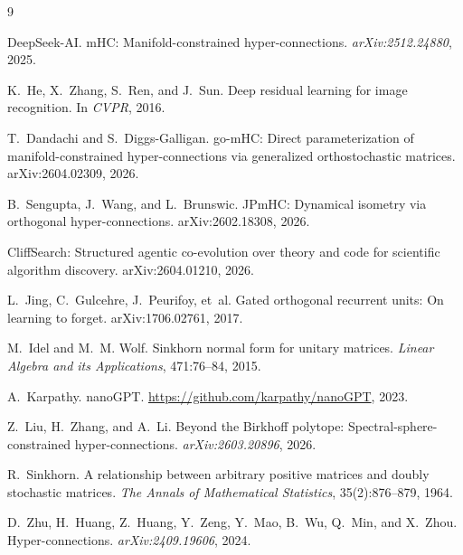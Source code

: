 \documentclass{article}
\begin{document}
\begin{thebibliography}{9}

DeepSeek-AI.
mHC: Manifold-constrained hyper-connections.
\emph{arXiv:2512.24880}, 2025.

K.~He, X.~Zhang, S.~Ren, and J.~Sun.
Deep residual learning for image recognition. In \emph{CVPR}, 2016.

T.~Dandachi and S.~Diggs-Galligan.
go-mHC: Direct parameterization of manifold-constrained hyper-connections via
generalized orthostochastic matrices. arXiv:2604.02309, 2026.

B.~Sengupta, J.~Wang, and L.~Brunswic.
JPmHC: Dynamical isometry via orthogonal hyper-connections. arXiv:2602.18308, 2026.

CliffSearch: Structured agentic co-evolution over theory and code for scientific
algorithm discovery. arXiv:2604.01210, 2026.

L.~Jing, C.~Gulcehre, J.~Peurifoy, et~al.
Gated orthogonal recurrent units: On learning to forget. arXiv:1706.02761, 2017.

M.~Idel and M.~M. Wolf.
Sinkhorn normal form for unitary matrices.
\emph{Linear Algebra and its Applications}, 471:76--84, 2015.

A.~Karpathy. nanoGPT. \url{https://github.com/karpathy/nanoGPT}, 2023.

Z.~Liu, H.~Zhang, and A.~Li.
Beyond the Birkhoff polytope: Spectral-sphere-constrained hyper-connections.
\emph{arXiv:2603.20896}, 2026.

R.~Sinkhorn.
A relationship between arbitrary positive matrices and doubly stochastic matrices.
\emph{The Annals of Mathematical Statistics}, 35(2):876--879, 1964.

D.~Zhu, H.~Huang, Z.~Huang, Y.~Zeng, Y.~Mao, B.~Wu, Q.~Min, and X.~Zhou.
Hyper-connections.
\emph{arXiv:2409.19606}, 2024.

\end{thebibliography}
\end{document}

